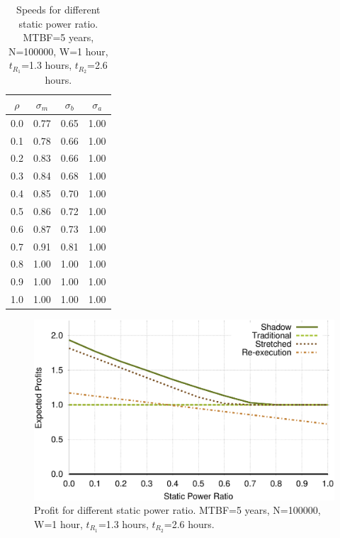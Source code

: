 \begin{table}[!h]\small
	\caption{Speeds for different static power ratio. MTBF=5 years, N=100000, W=1 hour, $t_{R_1}$=1.3 hours, $t_{R_2}$=2.6 hours.}
	\centering
		\begin{tabular}{|c|c|c|c|}
		\hline
		$\rho$ & $\sigma_m$ & $\sigma_b$ & $\sigma_a$ \\
		\hline
		0.0 &	0.77 & 	0.65 & 	1.00 \\
		\hline 
		0.1 &	0.78 &	0.66 &	1.00 \\
		\hline
		0.2 &	0.83 &	0.66 &	1.00 \\
		\hline
		0.3	&   0.84 &	0.68 &	1.00 \\
		\hline
		0.4	&   0.85 &	0.70 &	1.00 \\
		\hline
		0.5	&   0.86 &	0.72 &	1.00 \\
		\hline
		0.6	&   0.87 &	0.73 &	1.00 \\
		\hline
		0.7	&	0.91 &	0.81 &	1.00 \\
		\hline
		0.8	& 	1.00 &	1.00 &	1.00 \\
		\hline
		0.9	&	1.00 &	1.00 &	1.00 \\
		\hline
		1.0	&	1.00 &	1.00 &	1.00 \\
		\hline
		\end{tabular}
	\label{tbl:rho}
\end{table}

\begin{figure}[!h]	
	\begin{center}
		\includegraphics[width=\columnwidth]{diagrams/rho_profit.eps}
	\end{center}
	\caption{Profit for different static power ratio. MTBF=5 years, N=100000, W=1 hour, $t_{R_1}$=1.3 hours, $t_{R_2}$=2.6 hours.}
	\label{fig:rho}
\end{figure}

